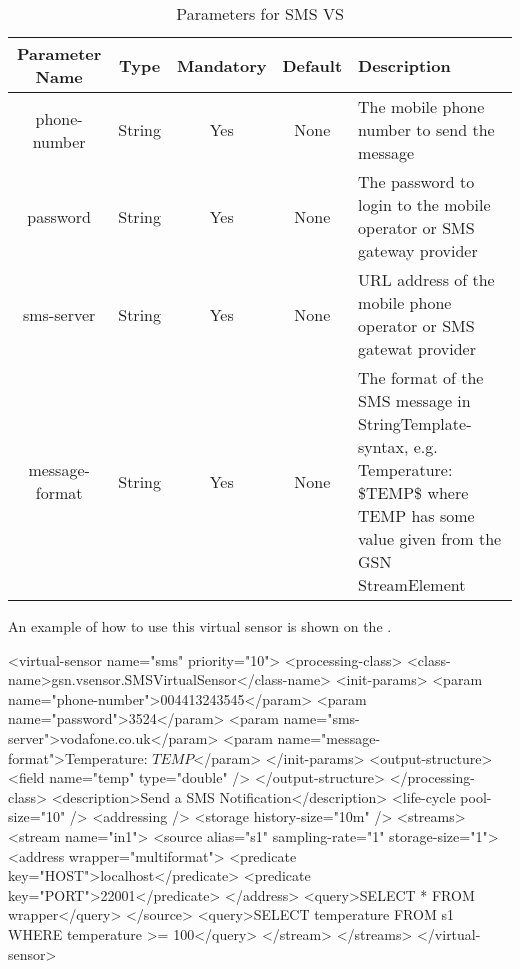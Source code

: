 \begin{table*}[!htp]
	\centering
	{\normalfont\footnotesize
	\begin{tabulary}{\textwidth}{|C|C|C|C|J|}%
	\hline
		\textbf{Parameter Name} &
		\textbf{Type} &
		\textbf{Mandatory} &
		\textbf{Default} &
		\textbf{Description} \\
	\hline
	\hline
		phone-number &
		String &	
		Yes &
		None &
		The mobile phone number to send the message \\
	\hline
		password &
		String &
		Yes &
		None &
		The password to login to the mobile operator or SMS gateway provider \\
	\hline
		sms-server &
		String &
		Yes &
		None &
		URL address of the mobile phone operator or SMS gatewat provider \\
	\hline
		message-format &
		String &
		Yes &
		None &
		The format of the SMS message in StringTemplate-syntax, e.g. Temperature: \$TEMP\$ where TEMP has some value given from the GSN StreamElement \\
	\hline
	\end{tabulary}
	}
	\caption{Parameters for SMS VS}
	\label{table:parameters_sms_vs}
\end{table*}

An example of how to use this virtual sensor is shown on the .

\begin{xmlcode}[caption={Sample of SMS Notification VSD file}, label=listing:xml:smsnotification_vsd]
<virtual-sensor name="sms" priority="10">
	<processing-class>
		<class-name>gsn.vsensor.SMSVirtualSensor</class-name>
		<init-params>
			<param name="phone-number">004413243545</param>
			<param name="password">3524</param>
			<param name="sms-server">vodafone.co.uk</param>
			<param name="message-format">Temperature: $TEMP$</param>
		</init-params>
		<output-structure>
			<field name="temp" type="double" />
		</output-structure>
	</processing-class>
	<description>Send a SMS Notification</description>
	<life-cycle pool-size="10" />
	<addressing />
	<storage history-size="10m" />
	<streams>
		<stream name="in1">
			<source alias="s1" sampling-rate="1" storage-size="1">
				<address wrapper="multiformat">
					<predicate key="HOST">localhost</predicate>
					<predicate key="PORT">22001</predicate>
				</address>
				<query>SELECT * FROM wrapper</query>
			</source>
			<query>SELECT temperature FROM s1 WHERE temperature >= 100</query>
		</stream>
	</streams>
</virtual-sensor>
\end{xmlcode}


